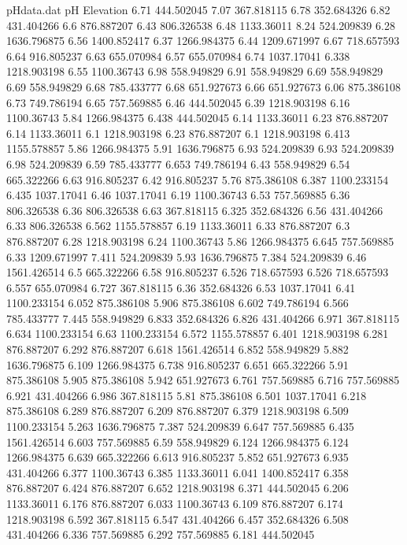 \begin{filecontents}{pHdata.dat}
pH	Elevation
6.71	444.502045
7.07	367.818115
6.78	352.684326
6.82	431.404266
6.6	876.887207
6.43	806.326538
6.48	1133.36011
8.24	524.209839
6.28	1636.796875
6.56	1400.852417
6.37	1266.984375
6.44	1209.671997
6.67	718.657593
6.64	916.805237
6.63	655.070984
6.57	655.070984
6.74	1037.17041
6.338	1218.903198
6.55	1100.36743
6.98	558.949829
6.91	558.949829
6.69	558.949829
6.69	558.949829
6.68	785.433777
6.68	651.927673
6.66	651.927673
6.06	875.386108
6.73	749.786194
6.65	757.569885
6.46	444.502045
6.39	1218.903198
6.16	1100.36743
5.84	1266.984375
6.438	444.502045
6.14	1133.36011
6.23	876.887207
6.14	1133.36011
6.1	1218.903198
6.23	876.887207
6.1	1218.903198
6.413	1155.578857
5.86	1266.984375
5.91	1636.796875
6.93	524.209839
6.93	524.209839
6.98	524.209839
6.59	785.433777
6.653	749.786194
6.43	558.949829
6.54	665.322266
6.63	916.805237
6.42	916.805237
5.76	875.386108
6.387	1100.233154
6.435	1037.17041
6.46	1037.17041
6.19	1100.36743
6.53	757.569885
6.36	806.326538
6.36	806.326538
6.63	367.818115
6.325	352.684326
6.56	431.404266
6.33	806.326538
6.562	1155.578857
6.19	1133.36011
6.33	876.887207
6.3	876.887207
6.28	1218.903198
6.24	1100.36743
5.86	1266.984375
6.645	757.569885
6.33	1209.671997
7.411	524.209839
5.93	1636.796875
7.384	524.209839
6.46	1561.426514
6.5	665.322266
6.58	916.805237
6.526	718.657593
6.526	718.657593
6.557	655.070984
6.727	367.818115
6.36	352.684326
6.53	1037.17041
6.41	1100.233154
6.052	875.386108
5.906	875.386108
6.602	749.786194
6.566	785.433777
7.445	558.949829
6.833	352.684326
6.826	431.404266
6.971	367.818115
6.634	1100.233154
6.63	1100.233154
6.572	1155.578857
6.401	1218.903198
6.281	876.887207
6.292	876.887207
6.618	1561.426514
6.852	558.949829
5.882	1636.796875
6.109	1266.984375
6.738	916.805237
6.651	665.322266
5.91	875.386108
5.905	875.386108
5.942	651.927673
6.761	757.569885
6.716	757.569885
6.921	431.404266
6.986	367.818115
5.81	875.386108
6.501	1037.17041
6.218	875.386108
6.289	876.887207
6.209	876.887207
6.379	1218.903198
6.509	1100.233154
5.263	1636.796875
7.387	524.209839
6.647	757.569885
6.435	1561.426514
6.603	757.569885
6.59	558.949829
6.124	1266.984375
6.124	1266.984375
6.639	665.322266
6.613	916.805237
5.852	651.927673
6.935	431.404266
6.377	1100.36743
6.385	1133.36011
6.041	1400.852417
6.358	876.887207
6.424	876.887207
6.652	1218.903198
6.371	444.502045
6.206	1133.36011
6.176	876.887207
6.033	1100.36743
6.109	876.887207
6.174	1218.903198
6.592	367.818115
6.547	431.404266
6.457	352.684326
6.508	431.404266
6.336	757.569885
6.292	757.569885
6.181	444.502045

\end{filecontents}
